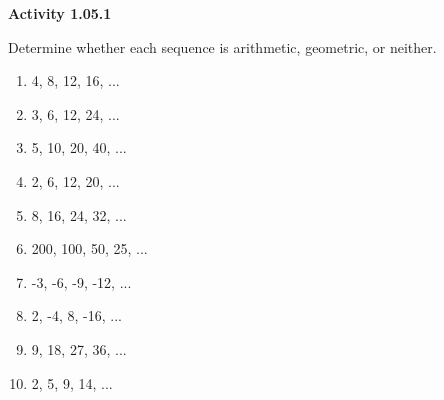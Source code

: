 \vspace{0.3ex}
\noindent\textbf{Activity 1.05.1}

\vspace{0.2ex}

Determine whether each sequence is arithmetic, geometric, or neither.
\begin{multicols}{2}
\begin{enumerate}
    \item 4, 8, 12, 16, ...
    \item 3, 6, 12, 24, ...
    \item 5, 10, 20, 40, ...
    \item 2, 6, 12, 20, ...
    \item 8, 16, 24, 32, ...
    \item 200, 100, 50, 25, ...
    \item -3, -6, -9, -12, ...
    \item 2, -4, 8, -16, ...
    \item 9, 18, 27, 36, ...
    \item 2, 5, 9, 14, ...
\end{enumerate}
\end{multicols}
